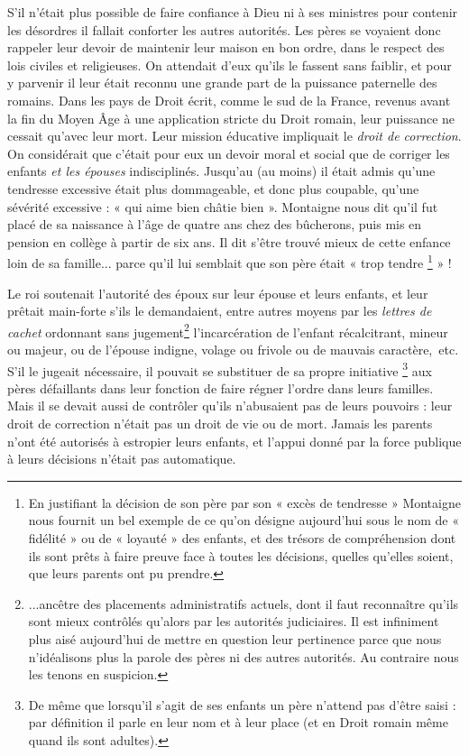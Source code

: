     
    S'il n'était plus possible de faire confiance à Dieu ni à ses ministres pour contenir les désordres il fallait conforter les autres autorités. Les pères se voyaient donc rappeler leur devoir de maintenir leur maison en bon ordre, dans le respect des lois civiles et religieuses. On attendait d'eux qu'ils le fassent sans faiblir, et pour y parvenir il leur était reconnu une grande part de la puissance paternelle des romains. Dans les pays de Droit écrit, comme le sud de la France, revenus avant la fin du Moyen Âge à une application stricte du Droit romain, leur puissance ne cessait qu'avec leur mort. Leur mission éducative impliquait le \emph{droit de correction}. On considérait que c'était pour eux un devoir moral et social que de corriger les enfants \emph{et les épouses} indisciplinés. Jusqu'au  (au moins) il était admis qu'une tendresse excessive était plus dommageable, et donc plus coupable, qu'une sévérité excessive : « {qui aime bien châtie bien} ». Montaigne nous dit qu'il fut placé de sa naissance à l'âge de quatre ans chez des bûcherons, puis mis en pension en collège à partir de six ans. Il dit s'être trouvé mieux de cette enfance loin de sa famille... parce qu'il lui semblait que son père était « trop tendre%
\footnote{En justifiant la décision de son père par son « excès de tendresse » Montaigne nous fournit un bel exemple de ce qu'on désigne aujourd'hui sous le nom de « fidélité » ou de « loyauté » des enfants, et des trésors de compréhension dont ils sont prêts à faire preuve face à toutes les décisions, quelles qu'elles soient, que leurs parents ont pu prendre.} 
» !

 Le roi soutenait l'autorité des époux sur leur épouse et leurs enfants, et leur prêtait main-forte s'ils le demandaient, entre autres moyens par les \emph{lettres de cachet} ordonnant sans jugement\footnote{...ancêtre des placements administratifs actuels, dont il faut reconnaître qu'ils sont mieux contrôlés qu'alors par les autorités judiciaires. Il est infiniment plus aisé aujourd'hui de mettre en question leur pertinence parce que nous n'idéalisons plus la parole des pères ni des autres autorités. Au contraire nous les tenons en suspicion.} l'incarcération de l'enfant récalcitrant, mineur ou majeur, ou de l'épouse indigne, volage ou frivole ou de mauvais caractère,~etc. S'il le jugeait nécessaire, il pouvait se substituer de sa propre initiative%
\footnote{De même que lorsqu'il s'agit de ses enfants un père n'attend pas d'être saisi : par définition il parle en leur nom et à leur place (et en Droit romain même quand ils sont adultes).} 
aux pères défaillants dans leur fonction de faire régner l'ordre dans leurs familles. 
 Mais il se devait aussi de contrôler qu'ils n'abusaient pas de leurs pouvoirs : leur droit de correction n'était pas un droit de vie ou de mort. Jamais les parents n'ont été autorisés à estropier leurs enfants, et l'appui donné par la force publique à leurs décisions n'était pas automatique.

